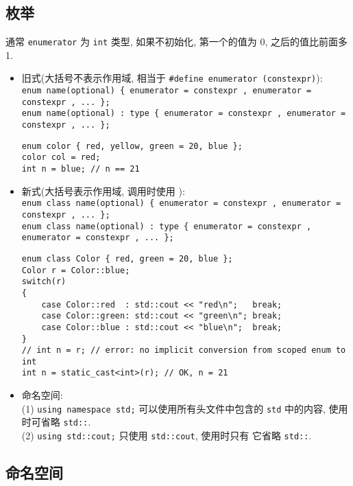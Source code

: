 \documentclass[a4paper,UTF8]{ctexart}
\begin{document}
\subsection{枚举}

通常 \lstinline{enumerator} 为 \lstinline{int} 类型, 如果不初始化, 第一个的值为 0, 之后的值比前面多 1.
\begin{itemize}[leftmargin=0pt, rightmargin=0cm, labelwidth=0.8cm, labelsep=0.2cm]
\item 旧式(大括号不表示作用域, 相当于 \lstinline{#define enumerator (constexpr)}):\\
  \lstinline$enum name(optional) { enumerator = constexpr , enumerator = constexpr , ... };$ \\
  \lstinline$enum name(optional) : type { enumerator = constexpr , enumerator = constexpr , ... };$
\begin{lstlisting}
enum color { red, yellow, green = 20, blue };
color col = red;
int n = blue; // n == 21
\end{lstlisting}
\item 新式(大括号表示作用域, 调用时使用 ):\\
  \lstinline$enum class name(optional) { enumerator = constexpr , enumerator = constexpr , ... };$ \\
  \lstinline$enum class name(optional) : type { enumerator = constexpr , enumerator = constexpr , ... };$
\begin{lstlisting}
enum class Color { red, green = 20, blue };
Color r = Color::blue;
switch(r)
{
    case Color::red  : std::cout << "red\n";   break;
    case Color::green: std::cout << "green\n"; break;
    case Color::blue : std::cout << "blue\n";  break;
}
// int n = r; // error: no implicit conversion from scoped enum to int
int n = static_cast<int>(r); // OK, n = 21
\end{lstlisting}
\item 命名空间:\\
(1) \lstinline{using namespace std;} \quad 可以使用所有头文件中包含的
\lstinline{std} 中的内容, 使用时可省略 \lstinline{std::}. \\
(2) \lstinline{using std::cout;} \quad 只使用 \lstinline{std::cout}, 使用时只有
它省略 \lstinline{std::}.
\end{itemize}

\subsection{命名空间}
\end{document}
